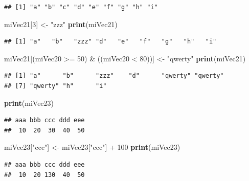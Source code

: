\documentclass[twoside,symmetric]{book}
\newenvironment{Shaded}{}{}
\newcommand{\DecValTok}[1]{#1}
\newcommand{\KeywordTok}[1]{\textbf{#1}}
\newcommand{\NormalTok}[1]{#1}
\newcommand{\OperatorTok}[1]{#1}
\newcommand{\StringTok}[1]{#1}
\begin{document}
\begin{verbatim}
## [1] "a" "b" "c" "d" "e" "f" "g" "h" "i"
\end{verbatim}

\begin{Shaded}
\begin{Highlighting}[]
\NormalTok{miVec21[}\DecValTok{3}\NormalTok{] <-}\StringTok{ "zzz"}
\KeywordTok{print}\NormalTok{(miVec21)}
\end{Highlighting}
\end{Shaded}

\begin{verbatim}
## [1] "a"   "b"   "zzz" "d"   "e"   "f"   "g"   "h"   "i"
\end{verbatim}

\begin{Shaded}
\begin{Highlighting}[]
\NormalTok{miVec21[(miVec20 }\OperatorTok{>=}\StringTok{ }\DecValTok{50}\NormalTok{) }\OperatorTok{&}\StringTok{ }\NormalTok{((miVec20 }\OperatorTok{<}\StringTok{ }\DecValTok{80}\NormalTok{))] <-}\StringTok{ "qwerty"}
\KeywordTok{print}\NormalTok{(miVec21)}
\end{Highlighting}
\end{Shaded}

\begin{verbatim}
## [1] "a"      "b"      "zzz"    "d"      "qwerty" "qwerty"
## [7] "qwerty" "h"      "i"
\end{verbatim}

\begin{Shaded}
\begin{Highlighting}[]
\KeywordTok{print}\NormalTok{(miVec23)}
\end{Highlighting}
\end{Shaded}

\begin{verbatim}
## aaa bbb ccc ddd eee 
##  10  20  30  40  50
\end{verbatim}

\begin{Shaded}
\begin{Highlighting}[]
\NormalTok{miVec23[}\StringTok{"ccc"}\NormalTok{] <-}\StringTok{ }\NormalTok{miVec23[}\StringTok{"ccc"}\NormalTok{] }\OperatorTok{+}\StringTok{ }\DecValTok{100}
\KeywordTok{print}\NormalTok{(miVec23)}
\end{Highlighting}
\end{Shaded}

\begin{verbatim}
## aaa bbb ccc ddd eee 
##  10  20 130  40  50
\end{verbatim}
\end{document}
